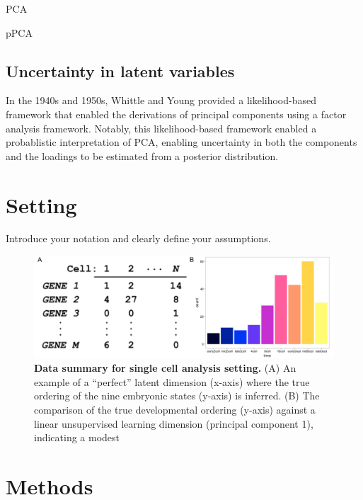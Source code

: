 \documentclass[english, 11pt]{article}\usepackage[]{graphicx}\usepackage[]{color}
\begin{document}
PCA \cite{jolliffe2002principal}

pPCA \cite{tipping1999probabilistic}


\subsection{Uncertainty in latent variables}

In the 1940s and 1950s, Whittle\cite{whittle1952principal} and Young \cite{young1941maximum} provided a likelihood-based framework that enabled the derivations of principal components using a factor analysis framework. Notably, this likelihood-based framework enabled a probablistic interpretation of PCA, enabling uncertainty in both the components and the loadings to be estimated from a posterior distribution. 




\section{Setting}

Introduce your notation and clearly define your assumptions. 

\begin{figure}[H]
\begin{center}
\includegraphics[scale=0.3]{images/Figure2.png}
\end{center}
\caption{\textbf{Data summary for single cell analysis setting.} (A) An example of a ``perfect'' latent dimension (x-axis) where the true ordering of the nine embryonic states (y-axis) is inferred. (B) The comparison of the true developmental ordering (y-axis) against a linear unsupervised learning dimension (principal component 1), indicating a modest}
\end{figure}





\section{Methods}
\end{document}
